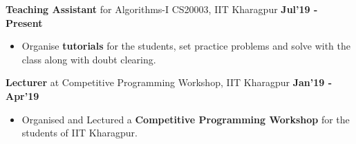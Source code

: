 \documentclass[10pt]{article}
\begin{document}
{}
\spacedhrule{0.1ex}{1.0ex}
\large { \textbf{Teaching Assistant} for Algorithms-I CS20003, IIT Kharagpur} \normalsize
\href{https://github.com/shmundhra/Credentials/tree/master/Teaching\%20Ventures} {\hspace{0.5ex}\faMousePointer}
{\hfill} \textbf{Jul'19 - Present}\\[-1.95em]
\begin{itemize}
    \item Organise \textbf{tutorials} for the students, set practice problems and solve with the class along with doubt clearing.\\[-1.5em]
\end{itemize}
\large { \textbf{Lecturer} at Competitive Programming Workshop, IIT Kharagpur} \normalsize
\href{https://github.com/shmundhra/Credentials/tree/master/Teaching\%20Ventures} {\hspace{0.5ex}\faMousePointer}
{\hfill} \textbf{Jan'19 - Apr'19}\\[-1.95em]
\begin{itemize}
    \item Organised and Lectured a \textbf{Competitive Programming Workshop} for the students of IIT Kharagpur.\\[-2em]
\end{itemize}
\end{document}
